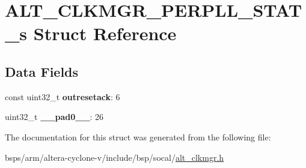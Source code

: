 \hypertarget{structALT__CLKMGR__PERPLL__STAT__s}{}\section{A\+L\+T\+\_\+\+C\+L\+K\+M\+G\+R\+\_\+\+P\+E\+R\+P\+L\+L\+\_\+\+S\+T\+A\+T\+\_\+s Struct Reference}
\label{structALT__CLKMGR__PERPLL__STAT__s}
\subsection*{Data Fields}
\begin{DoxyCompactItemize}
\item 
\mbox{\label{structALT__CLKMGR__PERPLL__STAT__s_aa57feaa153c4dd35777e246414b8c82c}} 
const uint32\+\_\+t {\bfseries outresetack}\+: 6
\item 
\mbox{\label{structALT__CLKMGR__PERPLL__STAT__s_a26ea61e9ff38ccae6f672e4265983025}} 
uint32\+\_\+t {\bfseries \+\_\+\+\_\+pad0\+\_\+\+\_\+}\+: 26
\end{DoxyCompactItemize}


The documentation for this struct was generated from the following file\+:\begin{DoxyCompactItemize}
\item 
bsps/arm/altera-\/cyclone-\/v/include/bsp/socal/\mbox{\hyperlink{alt__clkmgr_8h}{alt\+\_\+clkmgr.\+h}}\end{DoxyCompactItemize}
